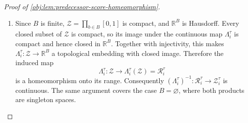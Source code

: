 \documentclass[11pt]{article}
\begin{document}
\begin{proof}[Proof of \cref{obj:lem:predecessor-score-homeomorphism}]
\begin{enumerate}
For \(\zeta\in[0,1]\), let \(v^{[b:\zeta]}\in[0,1]^n\) be the point obtained from \(v\) by replacing the coordinate \(\pi(b)\) by \(\zeta\):
\[
\bigl(v^{[b:\zeta]}\bigr)_a
=
\begin{cases}
\zeta, & a=\pi(b),\\
v_a, & a\ne \pi(b).
\end{cases}
\]
Define, on \([0,1]\), the one-coordinate score
\[
\psi_b(\zeta)
=
\log
\frac{q_{\pi(b)}(\zeta)}
{p_{\pi(b)}\!\left(\zeta\mid v_{\operatorname{pa}_G(\pi(b))}\right)}.
\]
Strict positivity and \(C^3\) regularity make \(\psi_b\) continuous on \([0,1]\) and differentiable on \((0,1)\). For \(0<\zeta<1\), the point \(v^{[b:\zeta]}\) lies in the latent cube, so the fixed own-derivative sign hypothesis gives
\[
0
<
s_{\pi(b)}\,
\frac{d}{d\zeta}
\log
\frac{q_{\pi(b)}(\zeta)}
{p_{\pi(b)}\!\left(\zeta\mid v_{\operatorname{pa}_G(\pi(b))}\right)}
=
s_{\pi(b)}\,\psi_b'(\zeta).
\]
Since \(s_{\pi(b)}\in\{-1,1\}\), the mean-value theorem yields, for any \(0\le \zeta_1<\zeta_2\le1\),
\[
\psi_b(\zeta_2)-\psi_b(\zeta_1)
=
\psi_b'(\zeta_\circ)(\zeta_2-\zeta_1)
\]
for some \(\zeta_\circ\in(\zeta_1,\zeta_2)\), with positive right-hand side when \(s_{\pi(b)}=1\) and negative right-hand side when \(s_{\pi(b)}=-1\). Thus \(\psi_b\) is strictly monotone on \([0,1]\).

Moreover,
\[
\psi_b(v_{\pi(b)})
=
\log
\frac{q_{\pi(b)}(v_{\pi(b)})}
{p_{\pi(b)}(v_{\pi(b)}\mid v_{\operatorname{pa}_G(\pi(b))})},
\]
and parent locality, together with \(v_a=w_a\) for all \(a\in\operatorname{pa}_G(\pi(b))\), gives
\[
p_{\pi(b)}(w_{\pi(b)}\mid v_{\operatorname{pa}_G(\pi(b))})
=
p_{\pi(b)}(w_{\pi(b)}\mid w_{\operatorname{pa}_G(\pi(b))}),
\]
so
\[
\psi_b(w_{\pi(b)})
=
\log
\frac{q_{\pi(b)}(w_{\pi(b)})}
{p_{\pi(b)}(w_{\pi(b)}\mid w_{\operatorname{pa}_G(\pi(b))})}.
\]
The equality \(L_b(f(v))=L_b(f(w))\) therefore gives
\[
\psi_b(v_{\pi(b)})=\psi_b(w_{\pi(b)}).
\]
By strict monotonicity of \(\psi_b\),
\[
v_{\pi(b)}=w_{\pi(b)}.
\]
The induction is complete. Finally, for each \(b\in B\),
\[
\chi_b=v_{\pi(b)}=w_{\pi(b)}=\chi'_b,
\]
so \(\chi=\chi'\) in the product cube. Thus \(\Lambda_i^\tau\) is injective. %

\item Since \(B\) is finite, \(\mathcal Z=\prod_{b\in B}[0,1]\) is compact, and \(\mathbb R^B\) is Hausdorff. Every closed subset of \(\mathcal Z\) is compact, so its image under the continuous map \(\Lambda_i^\tau\) is compact and hence closed in \(\mathbb R^B\). Together with injectivity, this makes \(\Lambda_i^\tau:\mathcal Z\to\mathbb R^B\) a topological embedding with closed image. Therefore the induced map
\[
\Lambda_i^\tau:\mathcal Z\longrightarrow \Lambda_i^\tau(\mathcal Z)=\mathcal R_i^\tau
\]
is a homeomorphism onto its range. Consequently \((\Lambda_i^\tau)^{-1}:\mathcal R_i^\tau\to\mathcal Z_i^\tau\) is continuous. The same argument covers the case \(B=\varnothing\), where both products are singleton spaces. %
\end{enumerate}
\end{proof}
\end{document}
